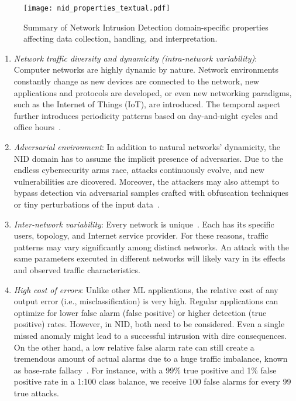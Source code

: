 \fi
\iftrue
\begin{figure}[t]
    \texttt{[image: nid\_properties\_textual.pdf]}
    \vspace*{-1.25em}
    \caption{Summary of Network Intrusion Detection domain-specific properties affecting data collection, handling, and interpretation.}
    \label{fig:nid_properties}
\end{figure}
\fi

\begin{enumerate}[wide, label={\arabic*)}, topsep=0pt, itemindent=\parindent, itemsep=0pt, parsep=0pt, partopsep=0pt]
    \item \emph{Network traffic diversity and dynamicity (intra-network variability)}: Computer networks are highly dynamic by nature. Network environments constantly change as new devices are connected to the network, new applications and protocols are developed, or even new networking paradigms, such as the Internet of Things (IoT), are introduced. The temporal aspect further introduces periodicity patterns based on day-and-night cycles and office hours~\cite{haffey2018_modeling_analysis_campus_edge}.

    \item \emph{Adversarial environment}: In addition to natural networks' dynamicity, the NID domain has to assume the implicit presence of adversaries. Due to the endless cybersecurity arms race, attacks continuously evolve, and new vulnerabilities are dicovered. Moreover, the attackers may also attempt to bypass detection via adversarial samples crafted with obfuscation techniques or tiny perturbations of the input data~\cite{he2023_adversarial_ml_nids_survey}.

    \item \emph{Inter-network variability}: Every network is unique~\cite{sommer2010_sok_outside}. Each has its specific users, topology, and Internet service provider. For these reasons, traffic patterns may vary significantly among distinct networks. An attack with the same parameters executed in different networks will likely vary in its effects and observed traffic characteristics.
    
    \item \emph{High cost of errors}: Unlike other ML applications, the relative cost of any output error (i.e., misclassification) is very high. Regular applications can optimize for lower false alarm (false positive) or higher detection (true positive) rates. However, in NID, both need to be considered. Even a single missed anomaly might lead to a successful intrusion with dire consequences. On the other hand, a low relative false alarm rate can still create a tremendous amount of actual alarms due to a huge traffic imbalance, known as base-rate fallacy~\cite{axelsson1999_base_rate_fallacy_ids}. For instance, with a 99\% true positive and 1\% false positive rate in a 1:100 class balance, we receive 100 false alarms for every 99 true attacks.


\end{enumerate}
